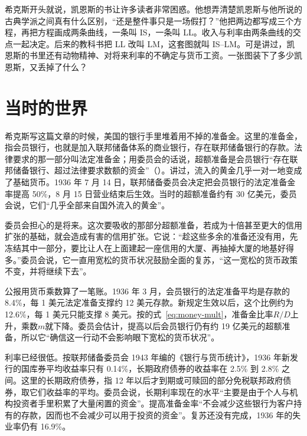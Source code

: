 希克斯开头就说，凯恩斯的书让许多读者非常困惑\cite{hicks1937}。他想弄清楚凯恩斯与他所说的古典学派之间真有什么区别，“还是整件事只是一场假打？”\cite{hicks1937}他把两边都写成三个方程，再把方程画成两条曲线，一条叫 IS，一条叫 LL\cite{hicks1937}。收入与利率由两条曲线的交点一起决定。后来的教科书把 LL 改叫 LM，这套图就叫 IS–LM。可是讲过，凯恩斯的书里还有动物精神、对将来利率的不确定与货币工资。一张图装下了多少凯恩斯，又丢掉了什么？

\section{当时的世界}\label{sec:islm-world}

希克斯写这篇文章的时候，美国的银行手里堆着用不掉的准备金。这里的准备金，指会员银行，也就是加入联邦储备体系的商业银行，存在联邦储备银行的存款。法律要求的那一部分叫法定准备金；用委员会的话说，超额准备是会员银行“存在联邦储备银行、超过法律要求数额的资金”\cite{frb1936aug}（）。讲过，流入的黄金几乎一对一地变成了基础货币。1936 年 7 月 14 日，联邦储备委员会决定把会员银行的法定准备金率提高 50\%，8 月 15 日营业结束后生效\cite{frb1936aug}。当时的超额准备约有 30 亿美元，委员会说，它们“几乎全部来自国外流入的黄金”\cite{frb1936aug}。

委员会担心的是将来。这次要吸收的那部分超额准备，若成为十倍甚至更大的信用扩张的基础，就会造成有害的信用扩张\cite{frb1936aug}。它说：“趁这些多余的准备还没有用，先冻结其中一部分，要比让人在上面建起一座信用的大厦、再抽掉大厦的地基好得多。”\cite{frb1936aug}委员会说，它一直用宽松的货币状况鼓励全面的复苏，“这一宽松的货币政策不变，并将继续下去”\cite{frb1936aug}。

公报用货币乘数算了一笔账。1936 年 3 月，会员银行的法定准备平均是存款的 8.4\%，每 1 美元法定准备支撑约 12 美元存款\cite{frb1936aug}。新规定生效以后，这个比例约为 12.6\%，每 1 美元只能支撑 8 美元\cite{frb1936aug}。按的式~\eqref{eq:money-mult}，准备金比率$R/D$上升，乘数$m$就下降。委员会估计，提高以后会员银行仍有约 19 亿美元的超额准备，所以它“确信这一行动不会影响眼下宽松的货币状况”\cite{frb1936aug}。

利率已经很低。按联邦储备委员会 1943 年编的《银行与货币统计》，1936 年新发行的国库券平均收益率只有 0.14\%，长期政府债券的收益率在 2.5\% 到 2.8\% 之间\cite{bms1943b}。这里的长期政府债券，指 12 年以后才到期或可赎回的部分免税联邦政府债券，取它们收益率的平均\cite{bms1943b}。委员会说，长期利率现在的水平“主要是由于个人与机构投资者手里积累了大量闲置的资金”\cite{frb1936aug}。提高准备金率“不会减少这些银行为客户持有的存款，因而也不会减少可以用于投资的资金”\cite{frb1936aug}。复苏还没有完成，1936 年的失业率仍有 16.9\%\cite{census1975a}。

